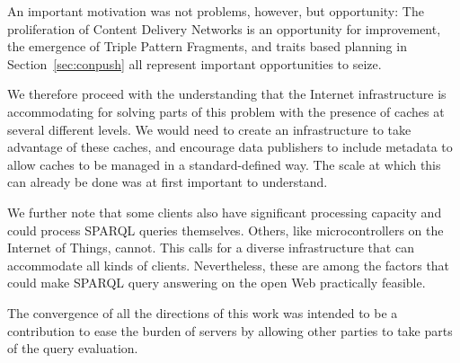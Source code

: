An important motivation was not problems, however, but opportunity:
The proliferation of Content Delivery Networks is an opportunity for
improvement, the emergence of Triple Pattern Fragments, and traits
based planning in Section~\ref{sec:conpush} all represent important
opportunities to seize.

We therefore proceed with the understanding that the Internet
infrastructure is accommodating for solving parts of this problem with
the presence of caches at several different levels. We would need to
create an infrastructure to take advantage of these caches, and
encourage data publishers to include metadata to allow caches to be
managed in a standard-defined way. The scale at which this can already
be done was at first important to understand.

We further note that some clients also have significant processing
capacity and could process SPARQL queries themselves. Others, like
microcontrollers on the Internet of Things, cannot. This calls for a
diverse infrastructure that can accommodate all kinds of
clients. Nevertheless, these are among the factors that
could make SPARQL query answering on the open Web practically
feasible. 

The convergence of all the directions of this work was intended to be
a contribution to ease the burden of servers by allowing other parties
to take parts of the query evaluation.



